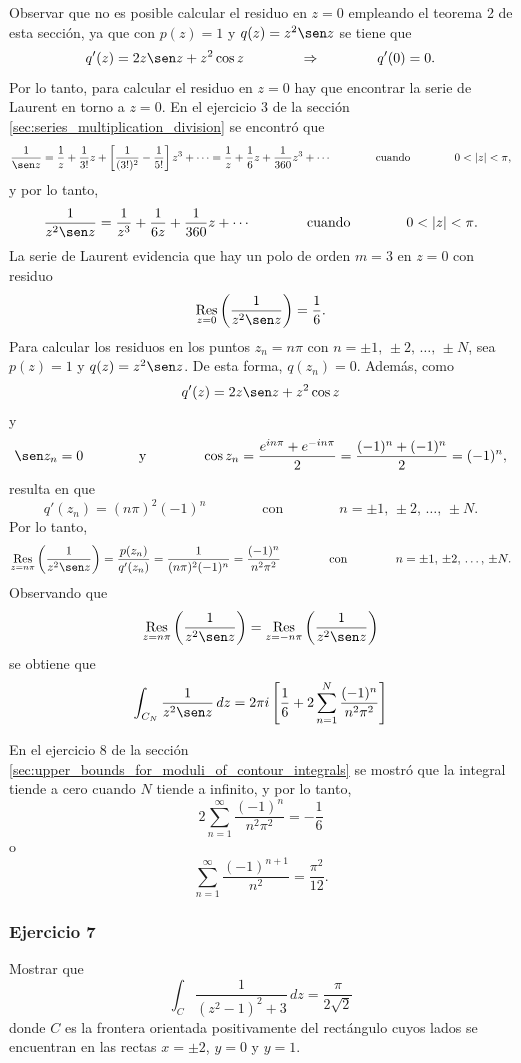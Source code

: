 \documentclass[a4paper]{report}
\def\Res{\qopname\relax m{Res}}
\begin{document}
Observar que no es posible calcular el residuo en \(z=0\) empleando el teorema 2 de esta sección, ya que con \(p(z)=1\) y \(q(z)=z^2\sen z\) se tiene que 
\[
 q'(z)=2z\sen z+z^2\cos z
 \qquad\qquad\Rightarrow\qquad\qquad
 q'(0)=0.
\]
Por lo tanto, para calcular el residuo en \(z=0\) hay que encontrar la serie de Laurent en torno a \(z=0\). En el ejercicio 3 de la sección \ref{sec:series_multiplication_division} se encontró que 
\[
 \frac{1}{\sen z}=\frac{1}{z}+\frac{1}{3!}z+\left[\frac{1}{(3!)^2}-\frac{1}{5!}\right]z^3+\cdots
 =\frac{1}{z}+\frac{1}{6}z+\frac{1}{360}z^3+\cdots
 \qquad\qquad\textrm{cuando}\qquad\qquad
 0<|z|<\pi,
\]
y por lo tanto,
\[
 \frac{1}{z^2\sen z}=\frac{1}{z^3}+\frac{1}{6z}+\frac{1}{360}z+\cdots
 \qquad\qquad\textrm{cuando}\qquad\qquad
 0<|z|<\pi.
\]
La serie de Laurent evidencia que hay un polo de orden \(m=3\) en \(z=0\) con residuo
\[
 \Res_{z=0}\left(\frac{1}{z^2\sen z}\right)=\frac{1}{6}.
\]
Para calcular los residuos en los puntos \(z_n=n\pi\) con \(n=\pm1,\,\pm2,\,\dots,\,\pm N\), sea \(p(z)=1\) y \(q(z)=z^2\sen z\). De esta forma, \(q(z_n)=0\). Además, como
\[
 q'(z)=2z\sen z+z^2\cos z
\]
y 
\[
 \sen z_n=0
 \qquad\qquad\textrm{y}\qquad\qquad
 \cos z_n=\frac{e^{in\pi}+e^{-in\pi}}{2}=\frac{(-1)^n+(-1)^n}{2}=(-1)^n,
\]
resulta en que 
\[
 q'(z_n)=(n\pi)^2(-1)^n
 \qquad\qquad\textrm{con}\qquad\qquad 
 n=\pm1,\,\pm2,\,\dots,\,\pm N.
\]
Por lo tanto,
\[
 \Res_{z=n\pi}\left(\frac{1}{z^2\sen z}\right)=\frac{p(z_n)}{q'(z_n)}=\frac{1}{(n\pi)^2(-1)^n}=\frac{(-1)^n}{n^2\pi^2}
 \qquad\qquad\textrm{con}\qquad\qquad 
 n=\pm1,\,\pm2,\,\dots,\,\pm N.
\]
Observando que
\[
 \Res_{z=n\pi}\left(\frac{1}{z^2\sen z}\right)=\Res_{z=-n\pi}\left(\frac{1}{z^2\sen z}\right)
\]
se obtiene que 
\[
 \int_{C_N}\frac{1}{z^2\sen z}\,dz=2\pi i\left[\frac{1}{6}+2\sum_{n=1}^N\frac{(-1)^n}{n^2\pi^2}\right]
\]

En el ejercicio 8 de la sección \ref{sec:upper_bounds_for_moduli_of_contour_integrals} se mostró que la integral tiende a cero cuando \(N\) tiende a infinito, y por lo tanto,
\[
 2\sum_{n=1}^\infty\frac{(-1)^n}{n^2\pi^2}=-\frac{1}{6}
\]
o
\[
 \sum_{n=1}^\infty\frac{(-1)^{n+1}}{n^2}=\frac{\pi^2}{12}.
\]

\subsubsection{Ejercicio 7} 

Mostrar que
\[
 \int_C\frac{1}{(z^2-1)^2+3}\,dz=\frac{\pi}{2\sqrt{2}}
\]
donde \(C\) es la frontera orientada positivamente del rectángulo cuyos lados se encuentran en las rectas \(x=\pm2\), \(y=0\) y \(y=1\). 
\end{document}
